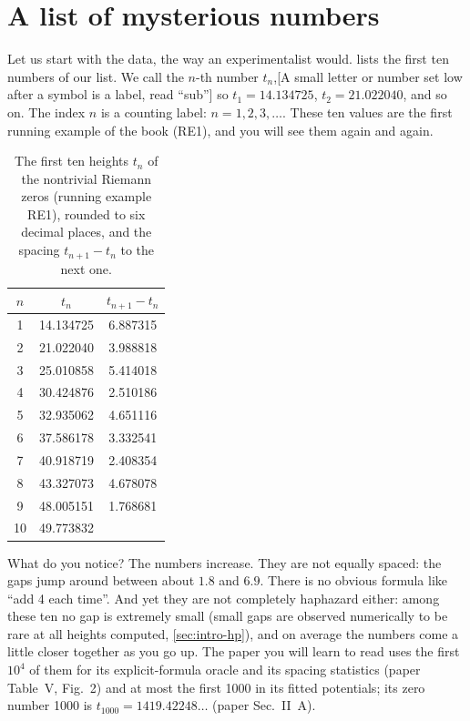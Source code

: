 \section{A list of mysterious numbers}\label{sec:intro-numbers}

Let us start with the data, the way an experimentalist would.  lists the first ten numbers of our list. We call the $n$-th number $t_n$,[A small letter or number set low after a symbol is a label, read ``sub''] so $t_1 = 14.134725$, $t_2 = 21.022040$, and so on. The index $n$ is a counting label: $n = 1, 2, 3, \ldots$. These ten values are the first running example of the book (RE1), and you will see them again and again.

\begin{table}[htbp]\centering
\caption{The first ten heights $t_n$ of the nontrivial Riemann zeros (running example RE1), rounded to six decimal places, and the spacing $t_{n+1}-t_n$ to the next one.}
\label{tab:intro-first10}
\begin{tabular}{ccc}
\toprule
$n$ & $t_n$ & $t_{n+1}-t_n$ \\
\midrule
1 & 14.134725 & 6.887315 \\
2 & 21.022040 & 3.988818 \\
3 & 25.010858 & 5.414018 \\
4 & 30.424876 & 2.510186 \\
5 & 32.935062 & 4.651116 \\
6 & 37.586178 & 3.332541 \\
7 & 40.918719 & 2.408354 \\
8 & 43.327073 & 4.678078 \\
9 & 48.005151 & 1.768681 \\
10 & 49.773832 & \\
\bottomrule
\end{tabular}
\end{table}

What do you notice? The numbers increase. They are not equally spaced: the gaps jump around between about $1.8$ and $6.9$. There is no obvious formula like ``add 4 each time''. And yet they are not completely haphazard either: among these ten no gap is extremely small (small gaps are observed numerically to be rare at all heights computed, \cref{sec:intro-hp}), and on average the numbers come a little closer together as you go up. The paper you will learn to read uses the first $10^4$ of them for its explicit-formula oracle and its spacing statistics (paper Table~V, Fig.~2) and at most the first 1000 in its fitted potentials; its zero number 1000 is $t_{1000} = 1419.42248\ldots$ (paper Sec.~II~A).

